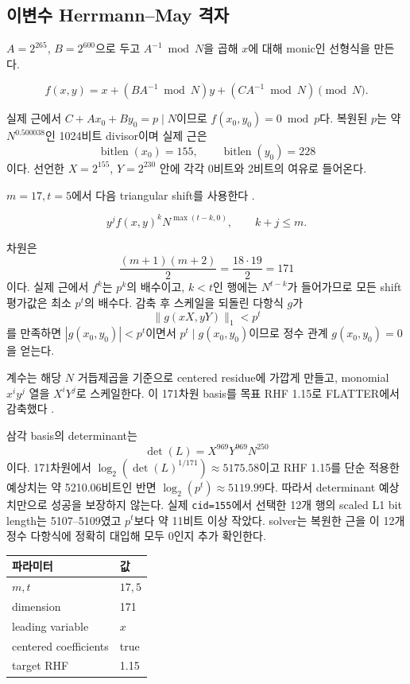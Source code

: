 \documentclass[10pt,a4paper]{article}
\begin{document}
\subsection{이변수 Herrmann--May 격자}

\(A=2^{265}\), \(B=2^{600}\)으로 두고 \(A^{-1}\bmod N\)을 곱해 \(x\)에
대해 monic인 선형식을 만든다.

\[
 f(x,y)=x+(BA^{-1}\bmod N)y+(CA^{-1}\bmod N)\pmod N .
\]

실제 근에서 \(C+Ax_0+By_0=p\mid N\)이므로
\(f(x_0,y_0)=0\bmod p\)다. 복원된 \(p\)는 약 \(N^{0.500038}\)인
1024비트 divisor이며 실제 근은
\[
 \operatorname{bitlen}(x_0)=155,\qquad
 \operatorname{bitlen}(y_0)=228
\]
이다. 선언한 \(X=2^{155}\), \(Y=2^{230}\) 안에 각각 0비트와 2비트의
여유로 들어온다.

\(m=17,t=5\)에서 다음 triangular shift를 사용한다
\cite{herrmann-may}.

\[
  y^j f(x,y)^k N^{\max(t-k,0)},\qquad k+j\le m.
\]

차원은
\[
  \frac{(m+1)(m+2)}2=\frac{18\cdot19}2=171
\]
이다. 실제 근에서 \(f^k\)는 \(p^k\)의 배수이고, \(k<t\)인 행에는
\(N^{t-k}\)가 들어가므로 모든 shift 평가값은 최소 \(p^t\)의 배수다.
감축 후 스케일을 되돌린 다항식 \(g\)가
\[
  \lVert g(xX,yY)\rVert_1<p^t
\]
를 만족하면 \(|g(x_0,y_0)|<p^t\)이면서
\(p^t\mid g(x_0,y_0)\)이므로 정수 관계 \(g(x_0,y_0)=0\)을 얻는다.

계수는 해당 \(N\) 거듭제곱을 기준으로 centered residue에 가깝게 만들고,
monomial \(x^iy^j\) 열을 \(X^iY^j\)로 스케일한다. 이 171차원 basis를
목표 RHF 1.15로 FLATTER에서 감축했다 \cite{flatter}.

삼각 basis의 determinant는
\[
  \det(L)=X^{969}Y^{969}N^{250}
\]
이다. 171차원에서
\(\log_2(\det(L)^{1/171})\approx5175.58\)이고 RHF 1.15를 단순 적용한
예상치는 약 5210.06비트인 반면
\(\log_2(p^t)\approx5119.99\)다. 따라서 determinant 예상치만으로
성공을 보장하지 않는다. 실제 \texttt{cid=155}에서 선택한 12개 행의
scaled L1 bit length는 5107--5109였고 \(p^t\)보다 약 11비트 이상
작았다. solver는 복원한 근을 이 12개 정수 다항식에 정확히 대입해 모두
0인지 추가 확인한다.

\begin{center}
\begin{tabular}{ll}
\toprule
파라미터 & 값 \\
\midrule
\(m,t\) & \(17,5\) \\
dimension & 171 \\
leading variable & \(x\) \\
centered coefficients & true \\
target RHF & 1.15 \\
\bottomrule
\end{tabular}
\end{center}
\end{document}

